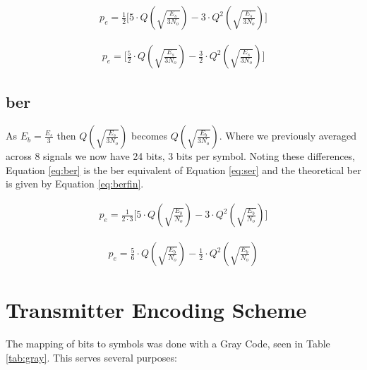\documentclass[A4, 12pt]{article}
\begin{document}
\begin{equation}
	\begin{split}
		p_e = \frac{1}{2}
		\Bigg[
			5 \cdot Q \left( \sqrt{ \frac{E_s}{3 N_o} } \right) - 3 \cdot Q^2 \left( \sqrt{ \frac{E_s}{3 N_o} } \right)
		\Bigg]
	\end{split}
	\label{eq:ser}
\end{equation}

\begin{equation}
	\begin{split}
		p_e =
		\Bigg[
			\frac{5}{2} \cdot Q \left( \sqrt{ \frac{E_s}{3 N_o} } \right) - \frac{3}{2} \cdot Q^2 \left( \sqrt{ \frac{E_s}{3 N_o} } \right)
		\Bigg]
	\end{split}
	\label{eq:serfin}
\end{equation}

\subsection{\ac{ber}}
As $E_b = \frac{E_s}{3}$ then $Q \left( \sqrt{ \frac{E_s}{3 N_o} } \right)$ becomes $Q \left( \sqrt{ \frac{E_b}{3 N_o} } \right)$.
Where we previously averaged across 8 signals we now have 24 bits, 3 bits per symbol.
Noting these differences, Equation \ref{eq:ber} is the \ac{ber} equivalent of Equation \ref{eq:ser} and the theoretical \ac{ber} is given by Equation \ref{eq:berfin}.

\begin{equation}
	\begin{split}
		p_e = \frac{1}{2 \cdot 3}
		\Bigg[
			5 \cdot Q \left( \sqrt{ \frac{E_b}{N_o} } \right) - 3 \cdot Q^2 \left( \sqrt{ \frac{E_b}{N_o} } \right)
		\Bigg]
	\end{split}
	\label{eq:ber}
\end{equation}

\begin{equation}
	\begin{split}
		p_e =
		\frac{5}{6} \cdot Q \left( \sqrt{ \frac{E_b}{N_o} } \right) - \frac{1}{2} \cdot Q^2 \left( \sqrt{ \frac{E_b}{N_o} } \right)
	\end{split}
	\label{eq:berfin}
\end{equation}

\section{Transmitter Encoding Scheme}

The mapping of bits to symbols was done with a Gray Code, seen in Table \ref{tab:gray}.
This serves several purposes:
\end{document}
